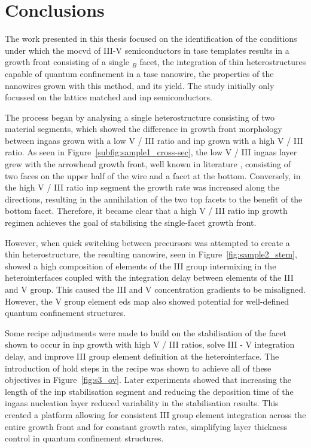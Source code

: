 \chapter{Conclusions}
\label{chap:conclusions}

The work presented in this thesis focused on the identification of the conditions under which the \acf{mocvd} of III-V semiconductors in \acf{tase} templates results in a growth front consisting of a single \(_B\) facet, the integration of thin heterostructures capable of quantum confinement in a \acs{tase} nanowire, the properties of the nanowires grown with this method, and its yield. The study initially only focussed on the lattice matched  and \acs{inp} semiconductors.

The process began by analysing a single heterostructure consisting of two material segments, which showed the difference in growth front morphology between \acf{ingaas} grown with a low V / III ratio and \acf{inp} grown with a high V / III ratio. As seen in Figure~\ref{subfig:sample1_cross-sec}, the low V / III \acs{ingaas} layer grew with the arrowhead growth front, well known in literature \cite{Knoedler2017}, consisting of two  faces on the upper half of the wire and a  facet at the bottom. Conversely, in the high V / III ratio \acs{inp} segment the growth rate was increased along the  directions, resulting in the annihilation of the two top  facets to the benefit of the bottom  facet. Therefore, it became clear that a high V / III ratio \acs{inp} growth regimen achieves the goal of stabilising the single-facet growth front.

However, when quick switching between precursors was attempted to create a thin heterostructure, the resulting nanowire, seen in Figure~\ref{fig:sample2_stem}, showed a high composition of elements of the III group intermixing in the heterointerfaces coupled with the integration delay between elements of the III and V group. This caused the III and V concentration gradients to be misaligned. However, the V group element \acf{eds} map also showed potential for well-defined quantum confinement structures.

Some recipe adjustments were made to build on the stabilisation of the  facet shown to occur in \acs{inp} growth with high V / III ratios, solve III - V integration delay, and improve III group element definition at the heterointerface. The introduction of hold steps in the recipe was shown to achieve all of these objectives in Figure~\ref{fig:s3_ov}. Later experiments showed that increasing the length of the \acs{inp} stabilisation segment and reducing the deposition time of the \acs{ingaas} nucleation layer reduced variability in the stabilisation results. This created a platform allowing for consistent III group element integration across the entire growth front and for constant growth rates, simplifying layer thickness control in quantum confinement structures.

